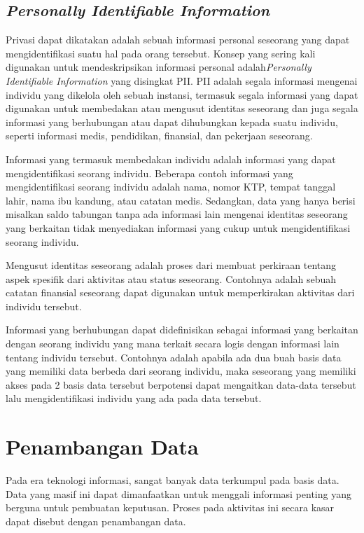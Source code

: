\subsection{\textit{Personally Identifiable Information}}
\label{subsec:pii}

Privasi dapat dikatakan adalah sebuah informasi personal seseorang yang dapat mengidentifikasi suatu hal pada orang tersebut. Konsep yang sering kali digunakan untuk mendeskripsikan informasi personal adalah\textit{Personally Identifiable Information} yang disingkat PII. PII adalah segala informasi mengenai individu yang dikelola oleh sebuah instansi, termasuk segala informasi yang dapat digunakan untuk membedakan atau mengusut identitas seseorang dan juga segala informasi yang berhubungan atau dapat dihubungkan kepada suatu individu, seperti informasi medis, pendidikan, finansial, dan pekerjaan seseorang.~\cite{nist:08:pii} 

Informasi yang termasuk membedakan individu adalah informasi yang dapat mengidentifikasi seorang individu. Beberapa contoh informasi yang mengidentifikasi seorang individu adalah nama, nomor KTP, tempat tanggal lahir, nama ibu kandung, atau catatan medis. Sedangkan, data yang hanya berisi misalkan saldo tabungan tanpa ada informasi lain mengenai identitas seseorang yang berkaitan tidak menyediakan informasi yang cukup untuk mengidentifikasi seorang individu.

Mengusut identitas seseorang adalah proses dari membuat perkiraan tentang aspek spesifik dari aktivitas atau status seseorang. Contohnya adalah sebuah catatan finansial seseorang dapat digunakan untuk memperkirakan aktivitas dari individu tersebut.

Informasi yang berhubungan dapat didefinisikan sebagai informasi yang berkaitan dengan seorang individu yang mana terkait secara logis dengan informasi lain tentang individu tersebut. Contohnya adalah apabila ada dua buah basis data yang memiliki data berbeda dari seorang individu, maka seseorang yang memiliki akses pada 2 basis data tersebut berpotensi dapat mengaitkan data-data tersebut lalu mengidentifikasi individu yang ada pada data tersebut.

\section{Penambangan Data}
\label{sec:penambangandata}

Pada era teknologi informasi, sangat banyak data terkumpul pada basis data. Data yang masif ini dapat dimanfaatkan untuk menggali informasi penting yang berguna untuk pembuatan keputusan. Proses pada aktivitas ini secara kasar dapat disebut dengan penambangan data.

